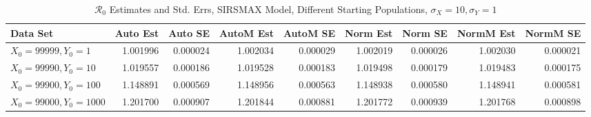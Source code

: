 \documentclass[12pt]{article}
\newcommand{\rr}{\ensuremath{\mathcal{R}_0}}
\begin{document}
\begin{table}[H]
	
	\caption{$\rr$ Estimates and Std. Errs, SIRSMAX Model,
		Different Starting Populations, 
		$\sigma_X = 10, \sigma_Y = 1$}
	\begin{footnotesize}
		\hskip -1.7cm
		\begin{tabular}{l|r|r|r|r|r|r|r|r}
			\hline
			Data Set & Auto Est & Auto SE & AutoM Est & AutoM SE & Norm Est & Norm SE & NormM Est & NormM SE\\
			\hline
			$X_0 = 99999, Y_0 = 1$ & 1.001996 & 0.000024 & 1.002034 & 0.000029 & 1.002019 & 0.000026 & 1.002030 & 0.000021\\
			\hline
			$X_0 = 99990, Y_0 = 10$ & 1.019557 & 0.000186 & 1.019528 & 0.000183 & 1.019498 & 0.000179 & 1.019483 & 0.000175\\
			\hline
			$X_0 = 99900, Y_0 = 100$ & 1.148891 & 0.000569 & 1.148956 & 0.000563 & 1.148938 & 0.000580 & 1.148941 & 0.000581\\
			\hline
			$X_0 = 99000, Y_0 = 1000$ & 1.201700 & 0.000907 & 1.201844 & 0.000881 & 1.201772 & 0.000939 & 1.201768 & 0.000898\\
			\hline
		\end{tabular}
	\end{footnotesize}
\end{table}
\end{document}
